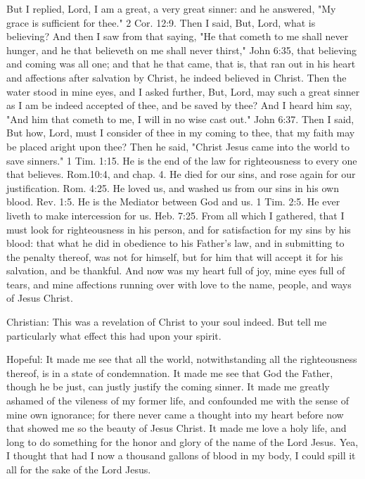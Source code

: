 But I replied, Lord, I am a great, a very great sinner: and he
answered, "My grace is sufficient for thee." 2 Cor. 12:9. Then I said,
But, Lord, what is believing? And then I saw from that saying, "He that
cometh to me shall never hunger, and he that believeth on me shall
never thirst," John 6:35, that believing and coming was all one; and
that he that came, that is, that ran out in his heart and affections
after salvation by Christ, he indeed believed in Christ. Then the water
stood in mine eyes, and I asked further, But, Lord, may such a great
sinner as I am be indeed accepted of thee, and be saved by thee? And I
heard him say, "And him that cometh to me, I will in no wise cast out."
John 6:37. Then I said, But how, Lord, must I consider of thee in my
coming to thee, that my faith may be placed aright upon thee? Then he
said, "Christ Jesus came into the world to save sinners." 1 Tim. 1:15.
He is the end of the law for righteousness to every one that believes.
Rom.10:4, and chap. 4. He died for our sins, and rose again for our
justification. Rom. 4:25. He loved us, and washed us from our sins in
his own blood. Rev. 1:5. He is the Mediator between God and us. 1 Tim.
2:5. He ever liveth to make intercession for us. Heb. 7:25. From all
which I gathered, that I must look for righteousness in his person, and
for satisfaction for my sins by his blood: that what he did in
obedience to his Father's law, and in submitting to the penalty
thereof, was not for himself, but for him that will accept it for his
salvation, and be thankful. And now was my heart full of joy, mine eyes
full of tears, and mine affections running over with love to the name,
people, and ways of Jesus Christ.

Christian: This was a revelation of Christ to your soul indeed. But
tell me particularly what effect this had upon your spirit.

Hopeful: It made me see that all the world, notwithstanding all the
righteousness thereof, is in a state of condemnation. It made me see
that God the Father, though he be just, can justly justify the coming
sinner. It made me greatly ashamed of the vileness of my former life,
and confounded me with the sense of mine own ignorance; for there never
came a thought into my heart before now that showed me so the beauty of
Jesus Christ. It made me love a holy life, and long to do something for
the honor and glory of the name of the Lord Jesus. Yea, I thought that
had I now a thousand gallons of blood in my body, I could spill it all
for the sake of the Lord Jesus.


